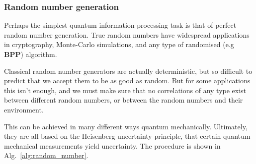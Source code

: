 \documentclass[aps,rmp,twocolumn,amsmath,amssymb,nofootinbib,superscriptaddress,longbibliography,floatfix,table-of-contents,eqsecnum]{revtex4-1}
\begin{document}
%
%

\subsubsection{Random number generation} 

Perhaps the simplest quantum information processing task is that of perfect random number generation. True random numbers have widespread applications in cryptography, Monte-Carlo simulations, and any type of randomised (e.g \textbf{BPP}) algorithm.

Classical random number generators are actually deterministic, but so difficult to predict that we accept them to be as good as random. But for some applications this isn't enough, and we must make sure that no correlations of any type exist between different random numbers, or between the random numbers and their environment.

This can be achieved in many different ways quantum mechanically. Ultimately, they are all based on the Heisenberg uncertainty principle, that certain quantum mechanical measurements yield uncertainty. The procedure is shown in Alg.~\ref{alg:random_number}.
\end{document}
